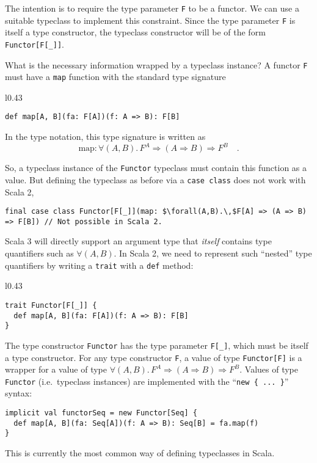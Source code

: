 \noindent The intention is to require the type parameter \lstinline!F!
to be a functor. We can use a suitable typeclass to implement this
constraint. Since the type parameter \lstinline!F! is itself a type
constructor, the typeclass constructor will be of the form \lstinline!Functor[F[_]]!. 

What is the necessary information wrapped by a typeclass instance?
A functor \lstinline!F! must have a \lstinline!map! function with
the standard type signature

\begin{wrapfigure}{l}{0.43\columnwidth}%
\vspace{-0.65\baselineskip}
\begin{lstlisting}
def map[A, B](fa: F[A])(f: A => B): F[B]
\end{lstlisting}
\vspace{-0.05\baselineskip}
\end{wrapfigure}%

\noindent In the type notation, this type signature is written as\vspace{-0.45\baselineskip}
\[
\text{map}:\forall(A,B).\,F^{A}\Rightarrow\left(A\Rightarrow B\right)\Rightarrow F^{B}\quad.
\]
\vspace{-1.5\baselineskip}

\noindent So, a typeclass instance of the \lstinline!Functor! typeclass
must contain this function as a value. But defining the typeclass
as before via a \lstinline!case class! does not work with Scala 2,
\begin{lstlisting}[mathescape=true]
final case class Functor[F[_]](map: $\forall(A,B).\,$F[A] => (A => B) => F[B]) // Not possible in Scala 2.
\end{lstlisting}
Scala 3 will directly support an argument type that \emph{itself}
contains type quantifiers such as $\forall(A,B)$. In Scala 2, we
need to represent such ``nested'' type quantifiers by writing a
\lstinline!trait! with a \lstinline!def! method:

\begin{wrapfigure}{l}{0.43\columnwidth}%
\vspace{-0.75\baselineskip}
\begin{lstlisting}
trait Functor[F[_]] {
  def map[A, B](fa: F[A])(f: A => B): F[B]
}
\end{lstlisting}
\vspace{-0.75\baselineskip}
\end{wrapfigure}%

\noindent The type constructor \lstinline!Functor! has the type parameter
\lstinline!F[_]!, which must be itself a type constructor. For any
type constructor \lstinline!F!, a value of type \lstinline!Functor[F]!
is a wrapper for a value of type $\forall(A,B).\,F^{A}\Rightarrow\left(A\Rightarrow B\right)\Rightarrow F^{B}$.
Values of type \lstinline!Functor! (i.e.~typeclass instances) are
implemented with the ``\lstinline!new { ... }!'' syntax:
\begin{lstlisting}
implicit val functorSeq = new Functor[Seq] {
  def map[A, B](fa: Seq[A])(f: A => B): Seq[B] = fa.map(f)
}
\end{lstlisting}
This is currently the most common way of defining typeclasses in Scala.

